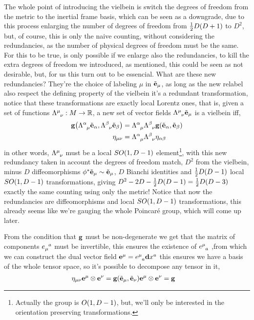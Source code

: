 The whole point of introducing the vielbein is switch the degrees of freedom from the 
metric to the inertial frame basis, which can be seen as a downgrade, due to this process enlarging the number of degrees of freedom from $\frac12D\qty(D+1)$ 
to $D^2$, but, of course, this is only the naive counting, without considering the redundancies, as the number of physical degrees of freedom must be the same. 
For this to be true, is only possible if we enlarge also the redundancies, to kill the extra degrees of freedom we introduced, as mentioned, this could be seen as 
not desirable, but, for us this turn out to be essencial. What are these new redundancies? They're the choice of labeling $\mu$ in $\tilde{\vb e}_\mu$, as long as the 
new relabel also respect the defining property of the vielbein it's a redundant transformation, notice that these transformations are exactly local Lorentz ones, that is, 
given a set of functions $\tensor{\Lambda}{^\mu_\nu}:M\rightarrow\mathbb R$, a new set of vector fields $\tensor{\Lambda}{^\mu_\nu}\tilde{\vb e}_\mu$ is a vielbein iff, 
\begin{align*}
    \vb g\qty(\tensor{\Lambda}{^\alpha_\mu}\tilde{\vb e}_\alpha,\tensor{\Lambda}{^\beta_\nu}\tilde{\vb e}_\beta)&=\tensor{\Lambda}{^\alpha_\mu}\tensor{\Lambda}{^\beta_\nu}\vb g\qty(\tilde{\vb e}_\alpha,\tilde{\vb e}_\beta)\\
    \eta_{\mu\nu}&=\tensor{\Lambda}{^\alpha_\mu}\tensor{\Lambda}{^\beta_\nu}\eta_{\alpha\beta}
\end{align*}
in other words, $\tensor{\Lambda}{^\mu_\nu}$ must be a local $SO\qty(1,D-1)$ element\footnote{Actually the group is $O\qty(1,D-1)$, but, we'll only be interested in the orientation preserving transformations.}, with this new redundancy taken in account the degrees of freedom match, $D^2$ 
from the vielbein, minus $D$ diffeomorphisms $\phi^\ast\tilde{\vb e}_\mu\sim\tilde{\vb e}_\mu$, $D$ Bianchi identities and $\frac12D\qty(D-1)$ local $SO\qty(1,D-1)$ transformations, giving $D^2-2D-\frac12D\qty(D-1)=\frac12D\qty(D-3)$ exactly 
the same counting using only the metric! Notice that now the redundancies are diffeomorphisms and local $SO\qty(1,D-1)$ transformations, this already seems like we're gauging the whole Poincaré group, which will come up later.

From the condition that $\vb g$ must be non-degenerate we get that the matrix of components $\tensor{e}{_\mu^a}$ must be invertible, this ensures 
the existence of $\tensor{e}{^\mu_a}$ ,from which we can construct the dual vector field $\vb e^\mu=\tensor{e}{^\mu_a}\vb d{x^a}$ this ensures 
we have a basis of the whole tensor space, so it's possible to decompose any tensor in it,
\begin{align*}
    \eta_{\mu\nu}\vb e^\mu\otimes\vb e^\nu&=\vb g\qty(\tilde{\vb e}_\mu,\tilde{\vb e}_\nu)\vb e^\mu\otimes\vb e^\nu=\vb g
\end{align*}

